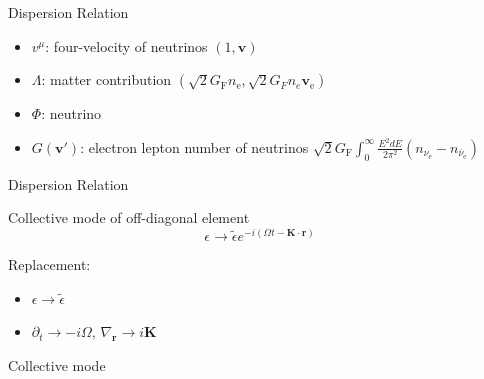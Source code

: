 \documentclass[9pt]{beamer}
\begin{document}
\begin{darkframes}
\begin{frame}{Dispersion Relation}
\pause

\begin{itemize}
    \item \colorbox{blue!50}{$ v^\mu$}:  four-velocity of neutrinos $(1, \boldsymbol v) $
    \item \colorbox{red!50}{$\Lambda$}: matter contribution $( \sqrt{2}G_{\mathrm F} n_{\mathrm e}, \sqrt{2}G_F n_e \boldsymbol v_{\mathrm e} )$
    \item \colorbox{ao!60}{$\Phi$}: neutrino
    \item \colorbox{armygreen!70}{$G(\mathbf v')$}: electron lepton number of neutrinos $\sqrt{2}G_{\mathrm F} \int_0^\infty \frac{E^2 dE}{2\pi^2} \left( n_{\nu_{\mathrm e}} - n_{\bar\nu_{\mathrm e}} \right)$
\end{itemize}



\end{frame}

\begin{frame}{Dispersion Relation}

\begin{tcolorbox}[standard jigsaw, opacityback=0]
    \color{white}
    Collective mode of off-diagonal element
\begin{equation*}
    \epsilon \to \tilde \epsilon e^{-i(\Omega t - \boldsymbol{ K}\cdot \boldsymbol{r} )}
\end{equation*}
\end{tcolorbox}

\pause

Replacement:
\begin{itemize}
    \item $\epsilon \to \tilde \epsilon$
    \item $\partial_t \to -i\Omega$, $\nabla_{\boldsymbol{r}}\to i \boldsymbol{K}$
\end{itemize}

\pause

\begin{tcolorbox}[standard jigsaw, opacityback=0]
    \color{white}
Collective mode




\end{tcolorbox}
\end{frame}
\end{darkframes}
\end{document}
